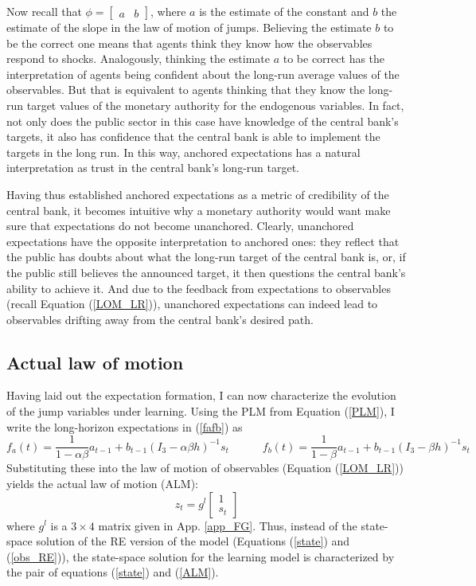 \documentclass[11pt]{article}
\renewcommand{\[}{\begin{equation}}
\renewcommand{\]}{\end{equation}}
\begin{document}
Now recall that $\phi = \begin{bmatrix} a & b \end{bmatrix}$, where $a$ is the estimate of the constant and $b$ the estimate of the slope in the law of motion of jumps. Believing the estimate $b$ to be the correct one means that agents think they know how the observables respond to shocks. Analogously, thinking  the estimate $a$ to be correct has the interpretation of agents being confident about the long-run average values of the observables. But that is equivalent to agents thinking that they know the long-run target values of the monetary authority for the endogenous variables. In fact, not only does the public sector in this case have knowledge of the central bank's targets, it also has confidence that the central bank is able to implement the targets in the long run. In this way, anchored expectations has a natural interpretation as trust in the central bank's long-run target. 

Having thus established anchored expectations as a metric of credibility of the central bank, it becomes intuitive why a monetary authority would want make sure that expectations do not become unanchored. Clearly, unanchored expectations have the opposite interpretation to anchored ones: they reflect that the public has doubts about what the long-run target of the central bank is, or, if the public still believes the announced target, it then questions the central bank's ability to achieve it. And due to the feedback from expectations to observables (recall Equation (\ref{LOM_LR})), unanchored expectations can indeed lead to observables drifting away from the central bank's desired path. 

\subsection{Actual law of motion}
Having laid out the expectation formation, I can now characterize the evolution of the jump variables under learning. Using the PLM from Equation (\ref{PLM}), I write the long-horizon expectations in (\ref{fafb}) as
\begin{equation}
f_a(t) = \frac{1}{1-\alpha\beta}a_{t-1}  + b_{t-1}(I_3 - \alpha\beta h)^{-1}s_t \quad \quad \quad f_b(t) = \frac{1}{1-\beta}a_{t-1}  + b_{t-1}(I_3 - \beta h)^{-1}s_t  \label{fafb}
\end{equation}
Substituting these into the law of motion of observables (Equation (\ref{LOM_LR})) yields the actual law of motion (ALM):
\begin{equation}
z_t = g^l \begin{bmatrix} 1 \\ s_t
\end{bmatrix}
\label{ALM}
\end{equation}
where $g^l$ is a $3\times4$ matrix given in App. \ref{app_FG}. Thus, instead of the state-space solution of the RE version of the model (Equations (\ref{state}) and (\ref{obs_RE})), the state-space solution for the learning model is characterized by the pair of equations (\ref{state}) and (\ref{ALM}). 
\end{document}
